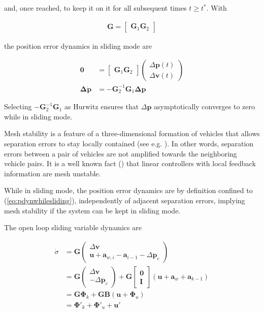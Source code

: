 \documentclass{ifacconf}
\providecommand{\mbf}[1]{\mathbf{#1}}
\begin{document}
and, once reached, to keep it on it for all subsequent times $t \geq t^*$. With

\begin{align}
\mbf{G} = 
\begin{bmatrix}
\mbf{G}_1 \mbf{G}_2
\end{bmatrix}
\end{align}

the position error dynamics in sliding mode are

\begin{align}
\mbf{0} 
&= 
\begin{bmatrix}
\mbf{G}_1 \mbf{G}_2
\end{bmatrix}
\begin{pmatrix}
\Delta \mbf{p}(t)\\
\Delta \mbf{v}(t)
\end{pmatrix} \\
\mbf{\Delta} \dot{\mbf{p}}
&= - \mbf{G}_2^{-1} \mbf{G}_1 \mbf{\Delta} \mbf{p}
\label{eq:pdynwhilesliding}
\end{align}

Selecting $- \mbf{G}_2^{-1} \mbf{G}_1$ as Hurwitz ensures that $\Delta \mbf{p}$ asymptotically converges to zero while in sliding mode.

Mesh stability is a feature of a three-dimensional formation of vehicles that allows separation errors to stay locally contained (see e.g. \cite{Pant2002}). In other words, separation errors between a pair of vehicles are not amplified towards the neighboring vehicle pairs. It is a well known fact (\cite{Pant2002}) that linear controllers with local feedback information are mesh unstable.

While in sliding mode, the position error dynamics are by definition confined to (\ref{eq:pdynwhilesliding}), independently of adjacent separation errors, implying mesh stability if the system can be kept in sliding mode.

The open loop sliding variable dynamics are

\begin{align}
\dot{{\sigma}} &= \mbf{G}
\begin{pmatrix}
\Delta \mbf{v} \\
\mbf{u} + \mbf{a}_{w,i} 
 - \mbf{a}_{i-1} -  \Delta \ddot{\mbf{p}}_c
\end{pmatrix}\\
& = \mbf{G} 
\begin{pmatrix}
\Delta \mbf{v} \\
 - \Delta \ddot{\mbf{p}}_c
\end{pmatrix} + \mbf{G}
\begin{bmatrix}
{\mbf{0}}\\
{\mbf{I}}
\end{bmatrix}
(\mbf{u} + \mbf{a}_w + \mbf{a}_{k-1}) \\
&= \mbf{G} \mbf{\Phi}_k + \mbf{G} \mbf{B}(
\mbf{u}
 + {\mbf\Phi}_u)
\label{eq:sigmadynconti}\\
&= \mbf{\Phi}'_k + \mbf{\Phi}'_u + \mbf{u}'
\label{eq:sigmadyncontishort}
\end{align}
\end{document}
